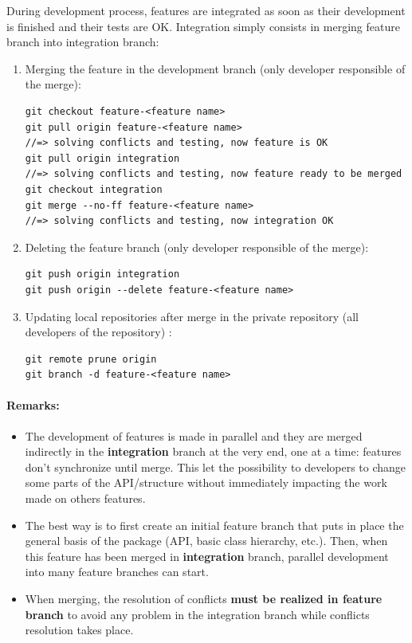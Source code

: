 \documentclass[12pt,a4paper]{article}
\begin{document}
During development process, features are integrated as soon as their development is finished and their tests are OK. Integration simply consists in merging feature branch into integration branch:
\begin{enumerate}
\item Merging the feature in the development branch (only developer responsible of the merge):
\begin{verbatim}
git checkout feature-<feature name>
git pull origin feature-<feature name>
//=> solving conflicts and testing, now feature is OK
git pull origin integration
//=> solving conflicts and testing, now feature ready to be merged
git checkout integration
git merge --no-ff feature-<feature name>
//=> solving conflicts and testing, now integration OK
\end{verbatim}
\item Deleting the feature branch (only developer responsible of the merge):
\begin{verbatim}
git push origin integration
git push origin --delete feature-<feature name>
\end{verbatim}
\item Updating local repositories after merge in the private repository (all developers of the repository) :
\begin{verbatim}
git remote prune origin
git branch -d feature-<feature name>
\end{verbatim}
\end{enumerate} 

\paragraph{Remarks:}
\begin{itemize}
\item The development of features is made in parallel and they are merged indirectly in the \textbf{integration} branch at the very end, one at a time: features don't synchronize until merge. This let the possibility to developers to change some parts of the API/structure without immediately impacting the work made on others features.
\item The best way is to first create an initial feature branch that puts in place the general basis of the package (API, basic class hierarchy, etc.). Then, when this feature has been merged in \textbf{integration} branch, parallel development into many feature branches can start.
\item When merging, the resolution of conflicts \textbf{must be realized in feature branch} to avoid any problem in the integration branch while conflicts resolution takes place.
\end{itemize}
\end{document}
